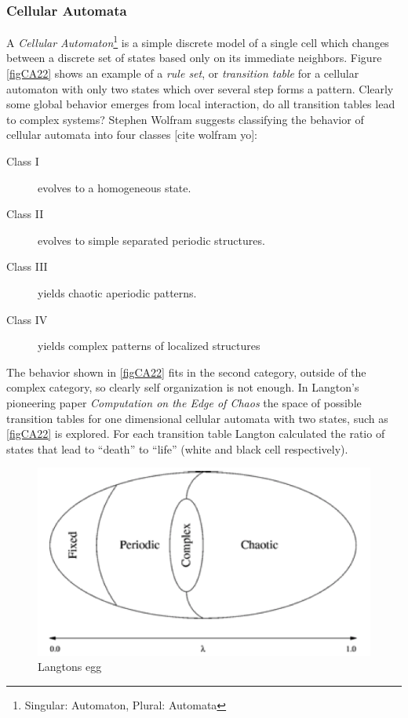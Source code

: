 \subsubsection{Cellular Automata}
A \emph{Cellular Automaton}\footnote{Singular: Automaton, Plural: Automata}
is a simple discrete model of a single cell which changes between a discrete set
of states based only on its immediate neighbors.
Figure \ref{figCA22} shows an example of a \emph{rule set}, or \emph{transition
  table} for a cellular automaton with only two states which over several step
forms a pattern.
Clearly some global behavior emerges from local interaction, do all transition
tables lead to complex systems?
%
Stephen Wolfram suggests classifying the behavior of cellular automata into four
classes [cite wolfram yo]:
\begin{description}
\item [Class I] evolves to a homogeneous state.
\item [Class II] evolves to simple separated periodic structures.
\item [Class III] yields chaotic aperiodic patterns.
\item [Class IV] yields complex patterns of localized structures
\end{description}
%
The behavior shown in \ref{figCA22} fits in the second category, outside of the
complex category, so clearly self organization is not enough.
%
In Langton's pioneering paper \emph{Computation on the Edge of Chaos}
\cite{langton_computation_1990} the space of possible transition tables for one
dimensional cellular automata with two states, such as \ref{figCA22} is explored.
For each transition table Langton calculated the ratio of states that lead to
``death'' to ``life'' (white and black cell respectively).
\begin{figure}[h!]
  \centering
  \includegraphics[width=1\textwidth]{fig/Langtons_egg2.png}
  \caption{Langtons egg}
  \label{figCAegg}
\end{figure}


